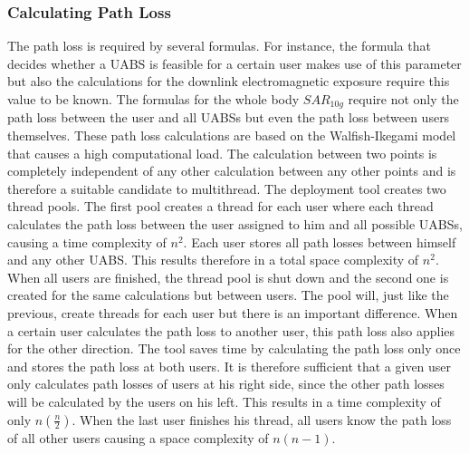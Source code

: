 \subsubsection{Calculating Path Loss}
The path loss is required by several formulas. For instance, the formula that decides whether a \gls{UABS} is feasible for a certain 
user makes use of this parameter but also the calculations for the downlink electromagnetic 
exposure require this value to be known. The formulas for the whole body $SAR_{10g}$ require not only the path loss between the user
and all \gls{UABS}s but even the path loss between users themselves. These path loss calculations are based on the Walfish-Ikegami 
model that causes a high computational load.  The calculation between two points is completely independent of any other calculation between any 
other points and is therefore a suitable candidate to multithread.
 The deployment tool creates two thread pools.
The first pool creates a thread for each user where each thread calculates the path loss between the user assigned to him and all possible \gls{UABS}s,
causing a time complexity of $n^2$.
Each user stores all path losses between himself and any other \gls{UABS}. This results therefore in a total space complexity of $n^2$.
When all users are finished, the thread pool is shut down and the second one is created for the same calculations but between users.
The pool will, just like the previous, create threads for each user but there is an important difference.
When a certain user calculates the path loss to another user, this path loss also applies for the other direction. The tool saves time by calculating the path loss only 
once and stores the path loss at both users. It is therefore sufficient that a given user only calculates path losses of users at his right side, since the other path losses will 
be calculated by the users on his left. This results in a time complexity of only $n(\frac{n}{2})$. When the last user finishes his thread, all users know the path loss of all other users causing 
a space complexity of $n(n-1)$.

